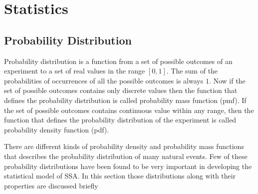 \chapter{Statistics}
\label{chapter:statistics} 
\section{Probability Distribution}
Probability distribution is a function from a set of possible outcomes of an experiment to a set of real values in the range $[0,1]$. The sum of the probabilities of occurrences of all the possible outcomes is always $1$. Now if the set of possible outcomes contains only discrete values then the function that defines the probability distribution is called probability mass function (pmf). If the set of possible outcomes contains continuous value within any range, then the function that defines the probability distribution of the experiment is called probability density function (pdf). \par \noindent There are different kinds of probability density and probability mass functions that describes the probability distribution of many natural events. Few of these probability distributions have been found to be very important in developing the statistical model of SSA. In this section those distributions along with their properties are discussed briefly
